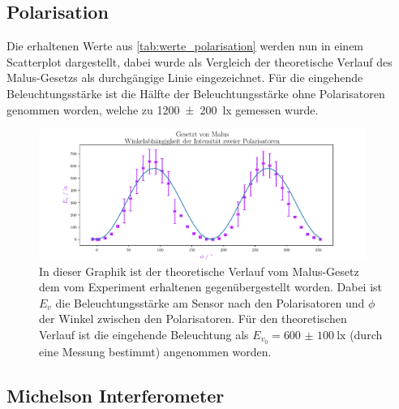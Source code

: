 \documentclass[12pt,english,ngerman]{scrartcl}
\begin{document}
\subsection{Polarisation}

Die erhaltenen Werte aus \autoref{tab:werte_polarisation} werden nun in einem
Scatterplot dargestellt, dabei wurde als Vergleich der theoretische Verlauf des
Malus-Gesetzs als durchgängige Linie eingezeichnet. Für die eingehende Beleuchtungsstärke ist die
Hälfte der Beleuchtungsstärke ohne Polarisatoren genommen worden, welche zu
\SI{1200(200)}{\lux} gemessen wurde.

\begin{figure}[H]
	\begin{center}
		\includegraphics[width=0.95\textwidth]{figures/pol.pdf}
	\end{center}
	\caption{In dieser Graphik ist der theoretische Verlauf vom Malus-Gesetz
    dem vom Experiment erhaltenen gegenübergestellt worden. Dabei ist $E_v$ 
    die Beleuchtungsstärke am Sensor nach den Polarisatoren und $\phi$ der
    Winkel zwischen den Polarisatoren. Für den theoretischen Verlauf ist die 
    eingehende Beleuchtung als $E_{v_0}=\SI{600(100)}{\lux}$ (durch eine Messung bestimmt)
    angenommen worden.
  }\label{fig:auswertung_polarisation}
\end{figure}


\subsection{Michelson Interferometer}

\end{document}
